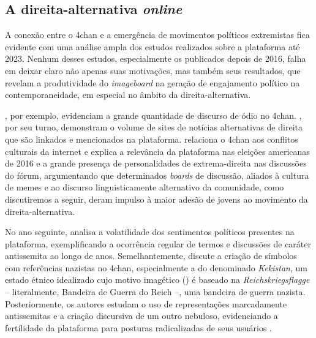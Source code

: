 \documentclass[portuguese]{textolivre}
\begin{document}
\subsection{A direita-alternativa \emph{online}}

A conexão entre o 4chan e a emergência de movimentos políticos extremistas fica evidente com uma análise ampla dos estudos realizados sobre a plataforma até 2023. Nenhum desses estudos, especialmente os publicados depois de 2016, falha em deixar claro não apenas suas motivações, mas também seus resultados, que revelam a produtividade do \emph{imageboard} na geração de engajamento político na contemporaneidade, em especial no âmbito da direita-alternativa.

\textcite{hine2017kek}, por exemplo, evidenciam a grande quantidade de discurso de ódio no 4chan. \textcite{zannettou2018origins}, por seu turno, demonstram o volume de sites de notícias alternativas de direita que são linkados e mencionados na plataforma. \textcite{nagle2017kill} relaciona o 4chan aos conflitos culturais da internet e explica a relevância da plataforma nas eleições americanas de 2016 e a grande presença de personalidades de extrema-direita nas discussões do fórum, argumentando que determinados \emph{boards} de discussão, aliados à cultura de memes e ao discurso linguisticamente alternativo da comunidade, como discutiremos a seguir, deram impulso à maior adesão de jovens ao movimento da direita-alternativa. 

No ano seguinte, \textcite{hagen2018} analisa a volatilidade dos sentimentos políticos presentes na plataforma, exemplificando a ocorrência regular de termos e discussões de caráter antissemita ao longo de anos. Semelhantemente, \textcite{tuters2018larping} discute a criação de símbolos com referências nazistas no 4chan, especialmente a do denominado \emph{Kekistan}, um estado étnico idealizado cujo motivo imagético () é baseado na \emph{Reichskriegsflagge} – literalmente, Bandeira de Guerra do Reich –, uma bandeira de guerra nazista. Posteriormente, os autores estudam o uso de representações marcadamente antissemitas e a criação discursiva de um outro nebuloso, evidenciando a fertilidade da plataforma para posturas radicalizadas de seus usuários \cite{tutershagen2020they}.
\end{document}
